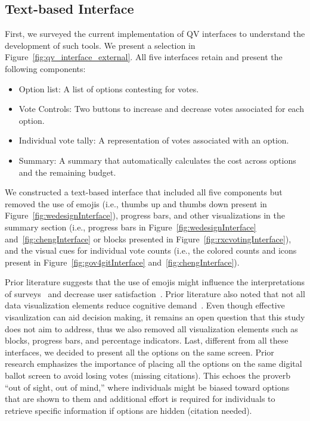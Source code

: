 \subsection{Text-based Interface}
First, we surveyed the current implementation of QV interfaces to understand the development of such tools. We present a selection in Figure~\ref{fig:qv_interface_external}. All five interfaces retain and present the following components:
\begin{itemize}
    \item Option list: A list of options contesting for votes.
    \item Vote Controls: Two buttons to increase and decrease votes associated for each option.
    \item Individual vote tally: A representation of votes associated with an option.
    \item Summary: A summary that automatically calculates the cost across options and the remaining budget.
\end{itemize}

We constructed a text-based interface that included all five components but removed the use of emojis (i.e., thumbs up and thumbs down present in Figure~\ref{fig:wedesignInterface}), progress bars, and other visualizations in the summary section (i.e., progress bars in Figure~\ref{fig:wedesignInterface} and~\ref{fig:chengInterface} or blocks presented in Figure~\ref{fig:rxcvotingInterface}), and the visual cues for individual vote counts (i.e., the colored counts and icons present in Figure~\ref{fig:gov4gitInterface} and~\ref{fig:chengInterface}).

Prior literature suggests that the use of emojis might influence the interpretations of surveys~\cite{herringGenderAgeInfluences2020} and decrease user satisfaction~\cite{toepoelSmileysStarsHearts2019}. Prior literature also noted that not all data visualization elements reduce cognitive demand~\cite{huangMeasuringEffectivenessGraph2009a}. Even though effective visaulization can aid decision making, it remains an open question that this study does not aim to address, thus we also removed all visualization elements such as blocks, progress bars, and percentage indicators. Last, different from all these interfaces, we decided to present all the options on the same screen. Prior research emphasizes the importance of placing all the options on the same digital ballot screen to avoid losing votes (missing citations). This echoes the proverb ``out of sight, out of mind,'' where individuals might be biased toward options that are shown to them and additional effort is required for individuals to retrieve specific information if options are hidden (citation needed).

